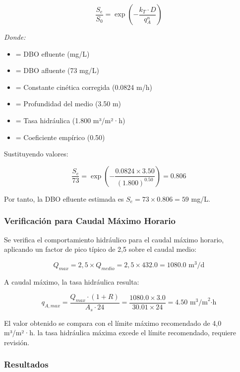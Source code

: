 \documentclass[12pt,a4paper]{article}
\begin{document}
\begin{equation}
\frac{S_e}{S_0} = \exp\left(-\frac{k_T \cdot D}{q_A^n}\right)
\end{equation}

\textit{Donde:}
\begin{itemize}[noitemsep,leftmargin=2em]
    \item[$S_e$] = DBO efluente (mg/L)
    \item[$S_0$] = DBO afluente (73 mg/L)
    \item[$k_T$] = Constante cinética corregida (0.0824 m/h)
    \item[$D$] = Profundidad del medio (3.50 m)
    \item[$q_A$] = Tasa hidráulica (1.800 m³/m²·h)
    \item[$n$] = Coeficiente empírico (0.50)
\end{itemize}

Sustituyendo valores:

\begin{equation}
\frac{S_e}{73} = \exp\left(-\frac{0.0824 \times 3.50}{(1.800)^{0.50}}\right) = 0.806
\end{equation}

Por tanto, la DBO efluente estimada es $S_e = 73 \times 0.806 = 59$ mg/L.

\subsubsection{Verificación para Caudal Máximo Horario}

Se verifica el comportamiento hidráulico para el caudal máximo horario, aplicando un factor de pico típico de 2,5 sobre el caudal medio:

\begin{equation}
Q_{max} = 2,5 \times Q_{medio} = 2,5 \times 432.0 = 1080.0 \text{ m}^3\text{/d}
\end{equation}

A caudal máximo, la tasa hidráulica resulta:

\begin{equation}
q_{A,max} = \frac{Q_{max} \cdot (1 + R)}{A_s \cdot 24} = \frac{1080.0 \times 3.0}{30.01 \times 24} = 4.50 \text{ m}^3\text{/m}^2\text{·h}
\end{equation}

El valor obtenido se compara con el límite máximo recomendado de 4,0 m³/m²·h. la tasa hidráulica máxima excede el límite recomendado, requiere revisión.

\subsubsection{Resultados}
\end{document}
